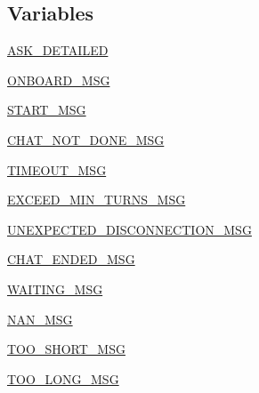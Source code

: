 \subsection*{Variables}
\begin{DoxyCompactItemize}
\item 
\hyperlink{namespaceprojects_1_1controllable__dialogue_1_1mturk_1_1worlds_a4ca95a909a40517d302d675464c373e3}{A\+S\+K\+\_\+\+D\+E\+T\+A\+I\+L\+ED}
\item 
\hyperlink{namespaceprojects_1_1controllable__dialogue_1_1mturk_1_1worlds_a94572b95f2afc6caa0fbd7c22f4382f1}{O\+N\+B\+O\+A\+R\+D\+\_\+\+M\+SG}
\item 
\hyperlink{namespaceprojects_1_1controllable__dialogue_1_1mturk_1_1worlds_ab9cb94c0361bca6f9b8fe4fe881ddc44}{S\+T\+A\+R\+T\+\_\+\+M\+SG}
\item 
\hyperlink{namespaceprojects_1_1controllable__dialogue_1_1mturk_1_1worlds_a40983a44f1f4da76cd7972bde9aa5795}{C\+H\+A\+T\+\_\+\+N\+O\+T\+\_\+\+D\+O\+N\+E\+\_\+\+M\+SG}
\item 
\hyperlink{namespaceprojects_1_1controllable__dialogue_1_1mturk_1_1worlds_adbd11a00c2dc2236022ece95fa5614bf}{T\+I\+M\+E\+O\+U\+T\+\_\+\+M\+SG}
\item 
\hyperlink{namespaceprojects_1_1controllable__dialogue_1_1mturk_1_1worlds_a59a9bd3d3ef13e977e3001a0e271630d}{E\+X\+C\+E\+E\+D\+\_\+\+M\+I\+N\+\_\+\+T\+U\+R\+N\+S\+\_\+\+M\+SG}
\item 
\hyperlink{namespaceprojects_1_1controllable__dialogue_1_1mturk_1_1worlds_a8a7e810c283f1ff8edf11a6b79119619}{U\+N\+E\+X\+P\+E\+C\+T\+E\+D\+\_\+\+D\+I\+S\+C\+O\+N\+N\+E\+C\+T\+I\+O\+N\+\_\+\+M\+SG}
\item 
\hyperlink{namespaceprojects_1_1controllable__dialogue_1_1mturk_1_1worlds_abadd7e1879bdba1b2eb989feca13a19a}{C\+H\+A\+T\+\_\+\+E\+N\+D\+E\+D\+\_\+\+M\+SG}
\item 
\hyperlink{namespaceprojects_1_1controllable__dialogue_1_1mturk_1_1worlds_a85d08711ac16f0d458dcd35207db63e6}{W\+A\+I\+T\+I\+N\+G\+\_\+\+M\+SG}
\item 
\hyperlink{namespaceprojects_1_1controllable__dialogue_1_1mturk_1_1worlds_ac0fe82c92d025257d2a1bf9ff663de4f}{N\+A\+N\+\_\+\+M\+SG}
\item 
\hyperlink{namespaceprojects_1_1controllable__dialogue_1_1mturk_1_1worlds_a1d95f260c5bffe85010ddc17bbfe9d2d}{T\+O\+O\+\_\+\+S\+H\+O\+R\+T\+\_\+\+M\+SG}
\item 
\hyperlink{namespaceprojects_1_1controllable__dialogue_1_1mturk_1_1worlds_af9e57a5260da3c2bbde3b745e2f8fc93}{T\+O\+O\+\_\+\+L\+O\+N\+G\+\_\+\+M\+SG}

\end{DoxyCompactItemize}
